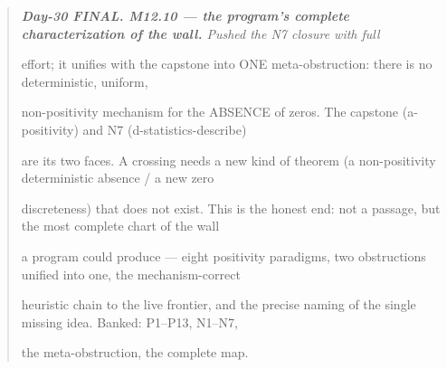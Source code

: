 \documentclass[10pt]{article}
\begin{document}
\begin{quote}\itshape
\textbf{Day-30 FINAL. M12.10 --- the program's complete characterization of the wall.} Pushed the N7 closure with full\par
effort; it unifies with the capstone into ONE meta-obstruction: there is no deterministic, uniform,\par
non-positivity mechanism for the ABSENCE of zeros. The capstone (a-positivity) and N7 (d-statistics-describe)\par
are its two faces. A crossing needs a new kind of theorem (a non-positivity deterministic absence / a new zero\par
discreteness) that does not exist. This is the honest end: not a passage, but the most complete chart of the wall\par
a program could produce --- eight positivity paradigms, two obstructions unified into one, the mechanism-correct\par
heuristic chain to the live frontier, and the precise naming of the single missing idea. Banked: P1--P13, N1--N7,\par
the meta-obstruction, the complete map.\par
\end{quote}
\end{document}
